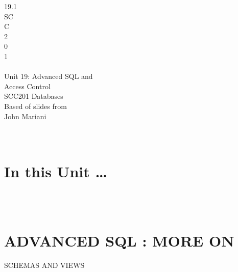 \documentclass[12pt]{article}
\begin{document}
19.1\\ 
SC\\ 
C\\ 
 2\\ 
0\\ 
1\\ 
 \\ 
Unit 19: Advanced SQL and \\ 
Access Control\\ 
SCC201 Databases\\ 
Based of slides from\\ 
John Mariani\\ 
\\ 
 \\ 
\section{In this Unit …}
\\ 
 \\ 
\section{ADVANCED SQL : MORE ON }
SCHEMAS AND VIEWS\\ 
\\ 
 \\ 
\end{document}
